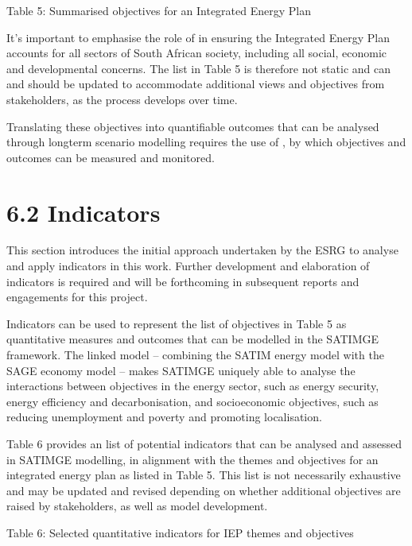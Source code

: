 \documentclass[letterpaper,10pt,english]{jupyterBook}
\begin{document}
\sphinxAtStartPar
Table 5: Summarised objectives for an Integrated Energy Plan



\sphinxAtStartPar
It’s important to emphasise the role of  in ensuring the Integrated Energy Plan accounts for all sectors of South African society, including all social, economic and developmental concerns. The list in Table 5 is therefore not static and can and should be updated to accommodate additional views and objectives from stakeholders, as the process develops over time.

\sphinxAtStartPar
Translating these objectives into quantifiable outcomes that can be analysed through long\sphinxhyphen{}term scenario modelling requires the use of , by which objectives and outcomes can be measured and monitored.


\section{6.2 Indicators}
\label{\detokenize{06Scenariodevelopment:indicators}}
\sphinxAtStartPar
This section introduces the initial approach undertaken by the ESRG to analyse and apply indicators in this work. Further development and elaboration of indicators is required and will be forthcoming in subsequent reports and engagements for this project.

\sphinxAtStartPar
Indicators can be used to represent the list of objectives in Table 5 as quantitative measures and outcomes that can be modelled in the SATIMGE framework. The linked model – combining the SATIM energy model with the SAGE economy model – makes SATIMGE uniquely able to analyse the interactions between objectives in the energy sector, such as energy security, energy efficiency and decarbonisation, and socio\sphinxhyphen{}economic objectives, such as reducing unemployment and poverty and promoting localisation.

\sphinxAtStartPar
Table 6 provides an  list of potential indicators that can be analysed and assessed in SATIMGE modelling, in alignment with the themes and objectives for an integrated energy plan as listed in Table 5. This list is not necessarily exhaustive and may be updated and revised depending on whether additional objectives are raised by stakeholders, as well as model development.

\sphinxAtStartPar
Table 6: Selected quantitative indicators for IEP themes and objectives
\end{document}
